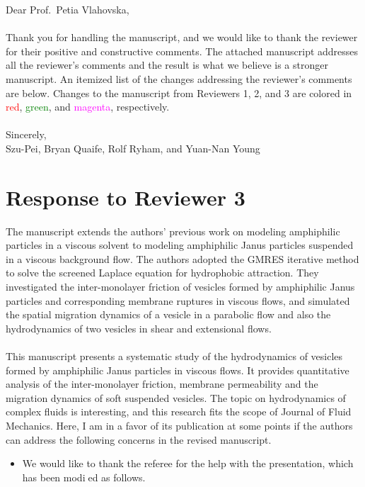 \documentclass[11pt]{article}
\newcommand{\comment}[1]{{\color{blue} #1}}
\begin{document}
\noindent
Dear Prof.~Petia Vlahovska,
\\ \\
\noindent
Thank you for handling the manuscript, and we would like to thank the
reviewer for their positive and constructive comments. The attached
manuscript addresses all the reviewer's comments and the result is what
we believe is a stronger manuscript. An itemized list of the changes
addressing the reviewer's comments are below. Changes to the manuscript
from Reviewers 1, 2, and 3 are colored in \textcolor{red}{red},
\textcolor{green}{green}, and \textcolor{magenta}{magenta},
respectively. \\ \\
\noindent
Sincerely,
\\
\noindent
Szu-Pei, Bryan Quaife, Rolf Ryham, and Yuan-Nan Young

\section*{Response to Reviewer 3}
\comment{\noindent
The manuscript extends the authors’ previous work on modeling
amphiphilic particles in a viscous solvent to modeling amphiphilic Janus
particles suspended in a viscous background flow. The authors adopted
the GMRES iterative method to solve the screened Laplace equation for
hydrophobic attraction. They investigated the inter-monolayer friction
of vesicles formed by amphiphilic Janus particles and corresponding
membrane ruptures in viscous flows, and simulated the spatial migration
dynamics of a vesicle in a parabolic flow and also the hydrodynamics of
two vesicles in shear and extensional flows.
\\ \\
\noindent
This manuscript presents a systematic study of the hydrodynamics of
vesicles formed by amphiphilic Janus particles in viscous flows. It
provides quantitative analysis of the inter-monolayer friction, membrane
permeability and the migration dynamics of soft suspended vesicles. The
topic on hydrodynamics of complex fluids is interesting, and this
research fits the scope of Journal of Fluid Mechanics. Here, I am in a
favor of its publication at some points if the authors can address the
following concerns in the revised manuscript.
}
\begin{itemize}
  \item We would like to thank the referee for the help with the presentation, which
has been modied as follows.
\end{itemize}
\end{document}
